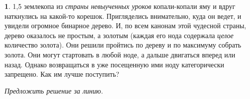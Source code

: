\documentclass[14pt, a4paper]{extarticle}
\theoremstyle{definition}
\newtheorem{problem}{}
\theoremstyle{definition}
\theoremstyle{remark}
\numberwithin{equation}{section}
\begin{document}
\begin{problem}
    1,5 землекопа из \textit{страны невыученных уроков} копали-копали яму
    и вдруг наткнулись на какой-то корешок. Пригляделись внимательно,
    куда он ведет, и увидели огромное бинарное дерево. И, по всем канонам
    этой чудесной страны, дерево оказалось не простым, а золотым 
    (каждая его нода
    содержала \textit{целое} количество золота). Они решили пройтись 
    по дереву и по максимуму собрать золота. Они могут
    стартовать в любой ноде, а дальше двигаться вперед или назад. 
    Однако возвращаться в уже посещенную ими ноду категорически 
    запрещено. Как им лучше поступить?

    \textit{Предложить решение за линию.}

    \begin{figure}[H]
        \centering

    \end{figure}

\end{problem}
\end{document}
